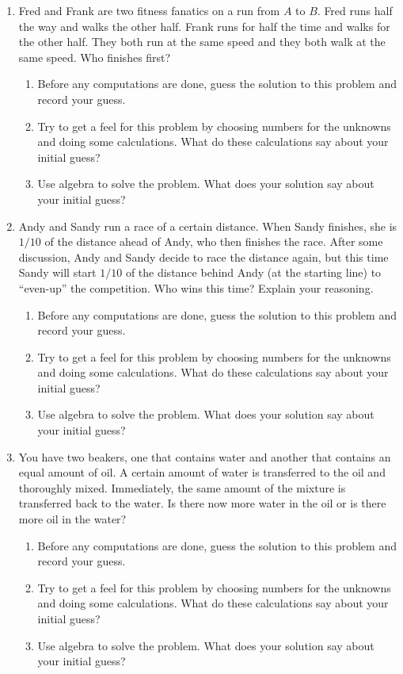 \begin{problems}
\begin{enumerate}
\item Fred and Frank are two fitness fanatics on a run from $A$ to
  $B$. Fred runs half the way and walks the other half. Frank runs for
  half the time and walks for the other half. They both run at the
  same speed and they both walk at the same speed. Who finishes first?
\begin{enumerate}
\item Before any computations are done, guess the
  solution to this problem and record your guess.  
\item Try to get a feel for this problem by choosing numbers for the
  unknowns and doing some calculations. What do these calculations say
  about your initial guess?
\item Use algebra to solve the problem.  What does your solution say 
about your initial guess?  
\end{enumerate}

\item Andy and Sandy run a race of a certain distance. When Sandy finishes, 
she is $1/10$ of the distance ahead of Andy, who then finishes the race. 
After some discussion, Andy and Sandy decide to race the distance again, but this time Sandy
  will start $1/10$ of the distance behind Andy (at the starting line) to ``even-up'' the
  competition. Who wins this time?  Explain your reasoning.  
\begin{enumerate}
\item Before any computations are done, guess the
  solution to this problem and record your guess.  
\item Try to get a feel for this problem by choosing numbers for the
  unknowns and doing some calculations. What do these calculations say
  about your initial guess?
\item Use algebra to solve the problem.  What does your solution say 
about your initial guess?  
\end{enumerate}

\item You have two beakers, one that contains water and another that
  contains an equal amount of oil. A certain amount of water is
  transferred to the oil and thoroughly mixed. Immediately, the same
  amount of the mixture is transferred back to the water. Is there now
  more water in the oil or is there more oil in the water?
\begin{enumerate}
\item Before any computations are done, guess the
  solution to this problem and record your guess.
\item Try to get a feel for this problem by choosing numbers for the
  unknowns and doing some calculations. What do these calculations say
  about your initial guess?
\item Use algebra to solve the problem.  What does your solution say 
about your initial guess?  
\end{enumerate}


\end{enumerate}
\end{problems}
